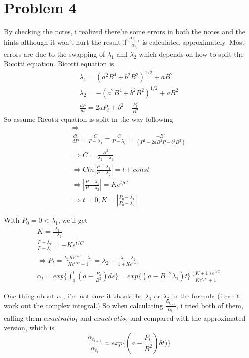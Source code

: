 \documentclass[a4paper,10pt]{article}
\begin{document}
\section{Problem 4}
By checking the notes, i realized there're some errors in both the notes and the hints although it won't hurt the result if $\frac{\alpha_{t_{i+1}}}{\alpha_{t_i}}$ is calculated approximately. Most errors are due to the swapping of $\lambda_1$ and $\lambda_2$ which depends on how to split the Ricotti equation. Ricotti equation is
\begin{eqnarray}
\lambda_1 = {(a^2B^4+b^2B^2)}^{1/2}+aB^2 \\
\lambda_2 = -{(a^2B^4+b^2B^2)}^{1/2}+aB^2 \\
\frac{dP}{dt} = 2aP_t + b^2 - \frac{P_t^2}{B^2}
\end{eqnarray}
So assume Ricotti equation is split in the way following
\begin{eqnarray}
\Rightarrow  \nonumber \\
\frac{dt}{dP} = \frac{C}{P - \lambda_1} - \frac{C}{P-\lambda_2} = \frac{-B^2}{(P^2-2aB^2P-b^2B^2)} \\
\Rightarrow C = \frac{B^2}{\lambda_2-\lambda_1} \label{eqn_C} \\
\Rightarrow Cln|\frac{P-\lambda_1}{P-\lambda_2}| = t + const \\
\Rightarrow |\frac{P-\lambda_1}{P-\lambda_2}| = Ke^{t/C} \\
\Rightarrow t=0, K=|\frac{P_0-\lambda_1}{P_0-\lambda_2}|
\end{eqnarray}

With $P_0 = 0 < \lambda_1 $, we'll get
\begin{eqnarray}
K = \frac{\lambda_1}{-\lambda_2} \\
\frac{P-\lambda_1}{P-\lambda_2} = -Ke^{t/C} \\
\Rightarrow P_t = \frac{\lambda_2Ke^{t/C}+\lambda_1}{Ke^{t/C}+1} = \lambda_2 + \frac{\lambda_1 - \lambda_2}{1+Ke^{t/C}} \\
\alpha_t = exp\{\int_0^t(a-\frac{P_s}{B^2})ds\} = exp\{(a-B^{-2}\lambda_1)t\}\frac{(K+1)e^{t/C}}{Ke^{t/C}+1}
\end{eqnarray}

One thing about $\alpha_t$, i'm not sure it should be $\lambda_1$ or $\lambda_2$ in the formula (i can't work out the complex integral.) So when calculating $\frac{\alpha_{t_{i+1}}}{\alpha_{t_i}}$, i tried both of them, calling them ${exactratio}_1$ and ${exactratio}_2$ and compared with the approximated version, which is
\begin{equation}
\frac{\alpha_{t_{i+1}}}{\alpha_{t_i}} \approx exp\{(a-\frac{P_{t_i}}{B^2})\delta t)\}
\end{equation}
\end{document}
